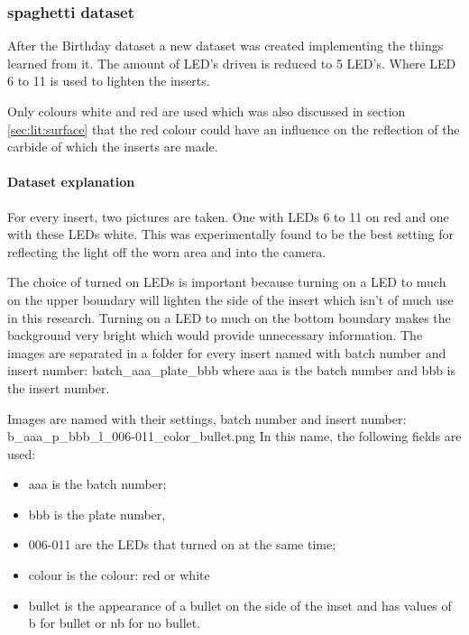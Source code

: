 \subsubsection{spaghetti dataset}

After the Birthday dataset a new dataset was created implementing the things learned from it. The amount of LED's driven is reduced to 5 LED's. Where LED 6 to 11 is used to lighten the inserts. 

Only colours white and red are used which was also discussed in section \ref{sec:lit:surface} that the red colour could have an influence on the reflection of the carbide of which the inserts are made.

\paragraph{Dataset explanation}

For every insert, two pictures are taken. One with LEDs 6 to 11 on red and one with these LEDs white. This was experimentally found to be the best setting for reflecting the light off the worn area and into the camera. 

The choice of turned on LEDs is important because turning on a LED to much on the upper boundary will lighten the side of the insert which isn't of much use in this research. Turning on a LED to much on the bottom boundary makes the background very bright which would provide unnecessary information.
The images are separated in a folder for every insert named with batch number and insert number:
batch\_aaa\_plate\_bbb where aaa is the batch number and bbb is the insert number.

Images are named with their settings, batch number and insert number:
b\_aaa\_p\_bbb\_l\_006-011\_color\_bullet.png 
In this name, the following fields are used:

\begin{itemize}
\item aaa is the batch number; 
\item bbb is the plate number, 
\item 006-011 are the LEDs that turned on at the same time; 
\item colour is the colour: red or white
\item bullet is the appearance of a bullet on the side of the inset and has values of b for bullet or nb for no bullet.
\end{itemize}



